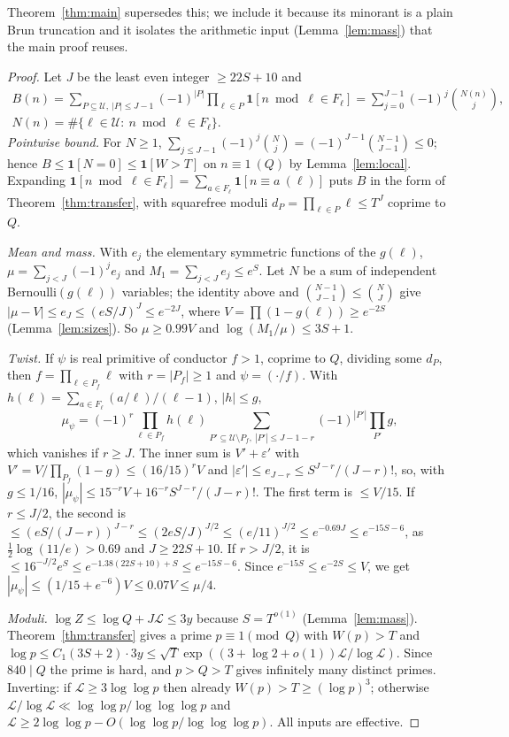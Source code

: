 \documentclass[11pt,reqno]{amsart}
\theoremstyle{definition}
\newcommand{\cU}{\mathcal U}
\newcommand{\Lc}{\mathcal L}
\begin{document}
Theorem~\ref{thm:main} supersedes this; we include it because its minorant is
a plain Brun truncation and it isolates the arithmetic input
(Lemma~\ref{lem:mass}) that the main proof reuses.

\begin{proof}

Let $J$ be the least even integer $\ge22S+10$ and
\begin{gather*}
 B(n)=\sum_{P\subseteq\cU,\ |P|\le J-1}(-1)^{|P|}\prod_{\ell\in P}\mathbf 1[n\bmod\ell\in F_\ell]
 =\sum_{j=0}^{J-1}(-1)^j\binom{N(n)}j,\\
 N(n)=\#\{\ell\in\cU:\ n\bmod\ell\in F_\ell\}.
\end{gather*}
\emph{Pointwise bound.}  For $N\ge1$,
$\sum_{j\le J-1}(-1)^j\binom Nj=(-1)^{J-1}\binom{N-1}{J-1}\le0$; hence
$B\le\mathbf 1[N=0]\le\mathbf 1[W>T]$ on $n\equiv1\ (Q)$ by Lemma~\ref{lem:local}.
Expanding $\mathbf 1[n\bmod\ell\in F_\ell]=\sum_{a\in F_\ell}\mathbf 1[n\equiv a\ (\ell)]$ puts $B$
in the form of Theorem~\ref{thm:transfer}, with squarefree moduli
$d_P=\prod_{\ell\in P}\ell\le T^{J}$ coprime to $Q$.

\emph{Mean and mass.}  With $e_j$ the elementary symmetric functions of the
$g(\ell)$, $\mu=\sum_{j<J}(-1)^je_j$ and $M_1=\sum_{j<J}e_j\le e^S$.  Let $N$ be a sum
of independent Bernoulli$(g(\ell))$ variables; the identity above and
$\binom{N-1}{J-1}\le\binom NJ$ give
$|\mu-V|\le e_J\le(eS/J)^J\le e^{-2J}$, where $V=\prod(1-g(\ell))\ge e^{-2S}$
(Lemma~\ref{lem:sizes}).  So $\mu\ge0.99V$ and $\log(M_1/\mu)\le3S+1$.

\emph{Twist.}  If $\psi$ is real primitive of conductor $f>1$, coprime to $Q$,
dividing some $d_P$, then $f=\prod_{\ell\in P_f}\ell$ with $r=|P_f|\ge1$ and
$\psi=(\cdot/f)$.  With $h(\ell)=\sum_{a\in F_\ell}(a/\ell)/(\ell-1)$, $|h|\le g$,
\[
 \mu_\psi=(-1)^r\prod_{\ell\in P_f}h(\ell)\sum_{P'\subseteq\cU\setminus P_f,\ |P'|\le J-1-r}(-1)^{|P'|}\prod_{P'}g ,
\]
which vanishes if $r\ge J$.  The inner sum is $V'+\varepsilon'$ with
$V'=V/\prod_{P_f}(1-g)\le(16/15)^rV$ and $|\varepsilon'|\le e_{J-r}\le S^{J-r}/(J-r)!$, so,
with $g\le1/16$,
$|\mu_\psi|\le15^{-r}V+16^{-r}S^{J-r}/(J-r)!$.  The first term is $\le V/15$.
If $r\le J/2$, the second is $\le(eS/(J-r))^{J-r}\le(2eS/J)^{J/2}\le(e/11)^{J/2}
\le e^{-0.69J}\le e^{-15S-6}$, as $\tfrac12\log(11/e)>0.69$ and $J\ge22S+10$.  If
$r>J/2$, it is $\le16^{-J/2}e^S\le e^{-1.38(22S+10)+S}\le e^{-15S-6}$.  Since
$e^{-15S}\le e^{-2S}\le V$, we get $|\mu_\psi|\le(1/15+e^{-6})V\le0.07V\le\mu/4$.

\emph{Moduli.}  $\log Z\le\log Q+J\Lc\le3y$ because $S=T^{o(1)}$
(Lemma~\ref{lem:mass}).  Theorem~\ref{thm:transfer} gives a prime $p\equiv1\pmod Q$
with $W(p)>T$ and $\log p\le C_1(3S+2)\cdot3y\le\sqrt T\exp((3+\log2+o(1))\Lc/\log\Lc)$.
Since $840\mid Q$ the prime is hard, and $p>Q>T$ gives infinitely many distinct
primes.  Inverting: if $\Lc\ge3\log\log p$ then already $W(p)>T\ge(\log p)^3$;
otherwise $\Lc/\log\Lc\ll\log\log p/\log\log\log p$ and
$\Lc\ge2\log\log p-O(\log\log p/\log\log\log p)$.  All inputs are effective.
\end{proof}
\end{document}

